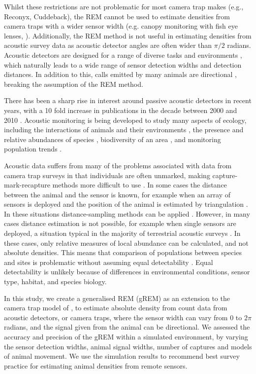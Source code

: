 Whilst these restrictions are not problematic for most camera trap makes (e.g., Reconyx, Cuddeback), the REM cannot be used to estimate densities from camera traps with a wider sensor width (e.g.
canopy monitoring with fish eye lenses, \cite{brusa2014increasing}).
Additionally, the REM method is not useful in estimating densities from acoustic survey data as acoustic detector angles are often wider than $\pi/2$ radians.  Acoustic detectors are designed for a range of diverse tasks and environments \cite{kessel2014review}, which naturally leads to a wide range of sensor detection widths and detection distances.
In addition to this, calls emitted by many animals are directional \cite{blumstein2011acoustic}, breaking the assumption of the REM method. 

There has been a sharp rise in interest around passive acoustic detectors in recent years, with a 10 fold increase in publications in the decade between 2000 and 2010 \cite{kessel2014review}.
Acoustic monitoring is being developed to study many aspects of ecology, including the interactions of animals and their environments \cite{blumstein2011acoustic, rogers2013density}, the presence and relative abundances of species \cite{marcoux2011local}, biodiversity of an area \cite{depraetere2012monitoring}, and monitoring population trends \cite{walters2013challenges}. 

Acoustic data suffers from many of the problems associated with data from camera trap surveys in that individuals are often unmarked, making capture-mark-recapture methods more difficult to use \cite{marques2013estimating}.
In some cases the distance between the animal and the sensor is known, for example when an array of sensors is deployed and the position of the animal is estimated by triangulation \cite{lewis2007sperm}.
In these situations distance-sampling methods can be applied \cite{buckland2008estimating}.
However, in many cases distance estimation is not possible, for example when single sensors are deployed, a situation typical in the majority of terrestrial acoustic surveys  \cite{buckland2008estimating}.
In these cases, only relative measures of local abundance can be calculated, and not absolute densities.
This means that comparison of populations between species and sites is problematic without assuming equal detectability \cite{schmidt2003count, walters2013challenges}.
Equal detectability is unlikely because of differences in environmental conditions, sensor type, habitat, and species biology. 

In this study, we create a generalised REM (gREM) as an extension to the camera trap model of \cite{rowcliffe2008estimating}, to estimate absolute density from count data from acoustic detectors, or camera traps, where the sensor width can vary from 0 to $2\pi$ radians, and the signal given from the animal can be directional.
We assessed the accuracy and precision of the gREM within a simulated environment, by varying the sensor detection widths, animal signal widths, number of captures and models of animal movement.
We use the simulation results to recommend best survey practice for estimating animal densities from remote sensors. 

